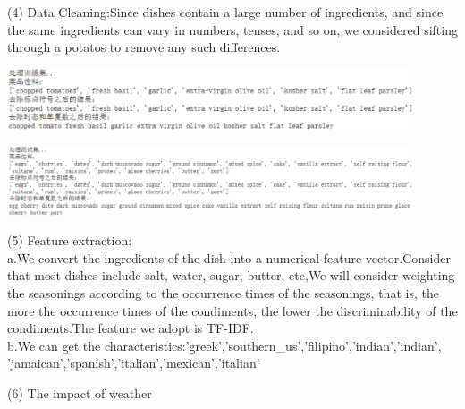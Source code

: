 (4)  Data Cleaning:Since dishes contain a large number of ingredients, and since the same ingredients can vary in numbers, tenses, and so on, we considered sifting through a potatos to remove any such differences.
\begin{center}
  \begin{minipage}{1\linewidth}
    \centering
    \includegraphics[width=0.9\textwidth]{pic01/clean1.eps}
  \end{minipage}
  \begin{minipage}{1\linewidth}
    \centering
    \includegraphics[width=0.9\textwidth]{pic01/clean2.eps}
  \end{minipage}
  
  \hfill
\end{center}




(5) Feature extraction:\\
a.We convert the ingredients of the dish into a numerical feature vector.Consider that most dishes include salt, water, sugar, butter, etc,We will consider weighting the seasonings according to the occurrence times of the seasonings, that is, the more the occurrence times of the condiments, the lower the discriminability of the condiments.The feature we adopt is TF-IDF.\\
b.We can get the characteristics:\lbrack'greek','southern\_us','filipino','indian','indian',\\
'jamaican','spanish','italian','mexican','italian'\rbrack
\begin{center}
  
  \hfill
\end{center}

(6)  The impact of weather

